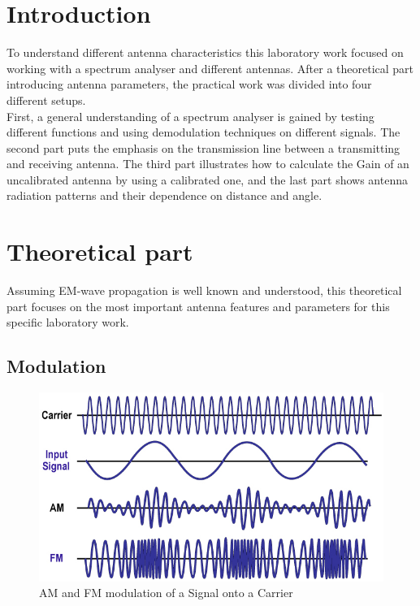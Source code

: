 \section{Introduction}
To understand different antenna characteristics this laboratory work focused on working with a spectrum analyser and different antennas. After a theoretical part introducing antenna parameters, the practical work was divided into four different setups.\\
First, a general understanding of a spectrum analyser is gained by testing different functions and using demodulation techniques on different signals. The second part puts the emphasis on the transmission line between a transmitting and receiving antenna. The third part illustrates how to calculate the Gain of an uncalibrated antenna by using a calibrated one, and the last part shows antenna radiation patterns and their dependence on distance and angle.


\section{Theoretical part}
\label{sec:theory}
Assuming EM-wave propagation is well known and understood, this theoretical part focuses on the most important antenna features and parameters for this specific laboratory work.

\subsection{Modulation}
\begin{figure}[h!]
	\centering
	\includegraphics[width=\textwidth/2 + 3em]{images/modulation.jpg}
	\caption{AM and FM modulation of a Signal onto a Carrier {\protect\footnotemark}}
	\label{fig:mod}
\end{figure}

